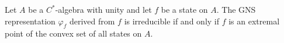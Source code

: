 Let $A$ be a $C^*$-algebra with unity and let $f$ be a state on $A$. The GNS representation $\varphi_f$ derived from $f$ is irreducible if and only if $f$ is an extremal point of the convex set of all states on $A$.
